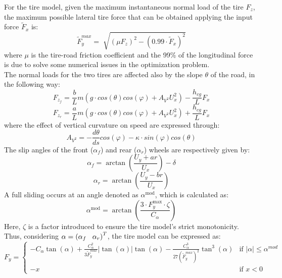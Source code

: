 \documentclass[a4paper, onecolumn, 11pt, twoside]{article}
\newcommand\tab[1][.3cm]{\hspace*{#1}}
\begin{document}
For the tire model, given the maximum instantaneous normal load of the tire $F_z$, the maximum possible
lateral tire force that can be obtained applying the input force $\tilde{F}_x$ is:
\begin{equation}
    \tilde{F}_y^{max} = \sqrt[]{(\mu F_z)^2 - (0.99\cdot \tilde{F}_x)^2}
\end{equation}
where $\mu$ is the tire-road friction coefficient and the 99\%  of the longitudinal force is due to solve 
some numerical issues in the optimization problem. \\
The normal loads for the two tires are affected also by the slope $\theta$ of the road, in the following way:
\begin{equation}
    F_{z_f} = \frac{b}{L}m(g\cdot cos(\theta)cos(\varphi)+A_{V^2}U_x^2)-\frac{h_{cg}}{L}F_x
\end{equation}
\begin{equation}
    F_{z_r} = \frac{a}{L}m(g\cdot cos(\theta)cos(\varphi)+A_{V^2}U_x^2)+\frac{h_{cg}}{L}F_x
\end{equation}
where the effect of vertical curvature on speed are expressed through:
\begin{equation}
    A_{V^2} = -\frac{d \theta}{d s}cos(\varphi)-\kappa\cdot sin(\varphi)cos(\theta) 
\end{equation}
The slip angles of the front ($\alpha_f$) and rear ($\alpha_r$) wheels are respectively given by:
\begin{equation}
    \alpha_f = \arctan \left(\frac{U_y+ar}{U_x}\right)-\delta
\end{equation}
\begin{equation}
    \alpha_r = \arctan \left(\frac{U_y-br}{U_x}\right)
\end{equation}
A full sliding occurs at an angle denoted as $\alpha^{\text{mod}}$, which is calculated as:
\begin{equation}
    \alpha^{\text{mod}} = \arctan\left(\frac{3\cdot F_y^{\text{max}}\cdot\zeta}{C_{\alpha}}\right)
\end{equation}
Here, $\zeta$ is a factor introduced to ensure the tire model's strict monotonicity.\\
Thus, considering $\alpha = \left(\alpha_f \tab \alpha_r\right)^T$, the tire model can
be expressed as:
\begin{equation}
    F_y = 
    \left\{
	\begin{array}{ll}
		-C_\alpha \tan(\alpha)+\frac{C_\alpha^2}{3\tilde{F}_y^{max}}|\tan(\alpha)|\tan(\alpha)-  \frac{C_\alpha^3}{27(\tilde{F}_{y}^{max})^2}\tan^3(\alpha) & \mbox{if } |\alpha| \leq \alpha^{mod} \\
		-x & \mbox{if } x < 0
	\end{array}
    \right.
\end{equation}
\end{document}
